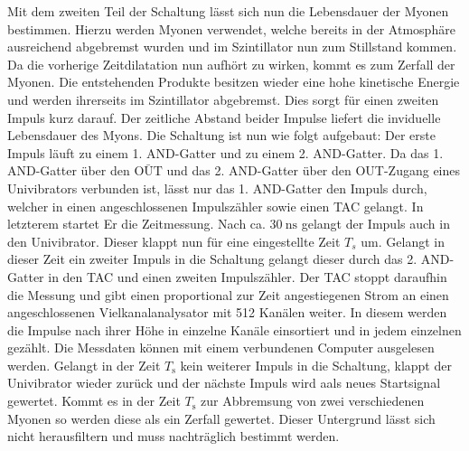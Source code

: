    Mit dem zweiten Teil der Schaltung lässt sich nun die Lebensdauer der Myonen bestimmen. Hierzu werden Myonen verwendet, welche bereits in der Atmosphäre ausreichend abgebremst wurden und im Szintillator nun zum Stillstand kommen. Da die vorherige Zeitdilatation nun aufhört zu wirken, kommt es zum Zerfall der Myonen. Die entstehenden Produkte besitzen wieder eine hohe kinetische Energie und werden ihrerseits im Szintillator abgebremst. Dies sorgt für einen zweiten Impuls kurz darauf. Der zeitliche Abstand beider Impulse liefert die inviduelle Lebensdauer des Myons. Die Schaltung ist nun wie folgt aufgebaut:
    Der erste Impuls läuft zu einem 1. AND-Gatter und zu einem 2. AND-Gatter. Da das 1. AND-Gatter über den $\bar{\text{OUT}}$  und das 2. AND-Gatter über den OUT-Zugang eines Univibrators verbunden ist, lässt nur das 1. AND-Gatter den Impuls durch, welcher in einen angeschlossenen Impulszähler sowie einen TAC gelangt. In letzterem startet Er die Zeitmessung. Nach ca. $\SI{30}{\nano\second}$ gelangt der Impuls auch in den Univibrator. Dieser klappt nun für eine eingestellte Zeit $T_s$ um. Gelangt in dieser Zeit ein zweiter Impuls in die Schaltung gelangt dieser durch das 2. AND-Gatter in den TAC und einen zweiten Impulszähler. Der TAC stoppt daraufhin die Messung und gibt einen proportional zur Zeit angestiegenen Strom an einen angeschlossenen Vielkanalanalysator mit 512 Kanälen weiter. In diesem werden die Impulse nach ihrer Höhe in einzelne Kanäle einsortiert und in jedem einzelnen gezählt. Die Messdaten können mit einem verbundenen Computer ausgelesen werden. Gelangt in der Zeit $T_\text{s}$ kein weiterer Impuls in die Schaltung, klappt der Univibrator wieder zurück und der nächste Impuls wird aals neues Startsignal gewertet. Kommt es in der Zeit $T_\text{s}$ zur Abbremsung von zwei verschiedenen Myonen so werden diese als ein Zerfall gewertet. Dieser Untergrund lässt sich nicht herausfiltern und muss nachträglich bestimmt werden.          
